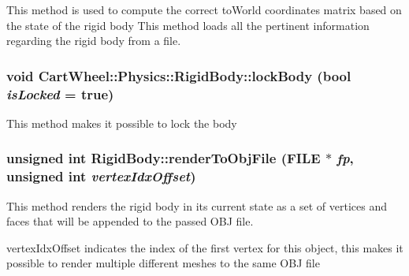 This method is used to compute the correct toWorld coordinates matrix based on the state of the rigid body This method loads all the pertinent information regarding the rigid body from a file. \hypertarget{classCartWheel_1_1Physics_1_1RigidBody_a7b491a48c13693d6839c6b6f3e9f6dda}{
\subsubsection[{lockBody}]{\setlength{\rightskip}{0pt plus 5cm}void CartWheel::Physics::RigidBody::lockBody (bool {\em isLocked} = {\ttfamily true})}}
\label{classCartWheel_1_1Physics_1_1RigidBody_a7b491a48c13693d6839c6b6f3e9f6dda}
This method makes it possible to lock the body \hypertarget{classCartWheel_1_1Physics_1_1RigidBody_a8689b1157719fb47697bb860d3c7b5b4}{
\subsubsection[{renderToObjFile}]{\setlength{\rightskip}{0pt plus 5cm}unsigned int RigidBody::renderToObjFile (FILE $\ast$ {\em fp}, \/  unsigned int {\em vertexIdxOffset})}}
\label{classCartWheel_1_1Physics_1_1RigidBody_a8689b1157719fb47697bb860d3c7b5b4}
This method renders the rigid body in its current state as a set of vertices and faces that will be appended to the passed OBJ file.

vertexIdxOffset indicates the index of the first vertex for this object, this makes it possible to render multiple different meshes to the same OBJ file

